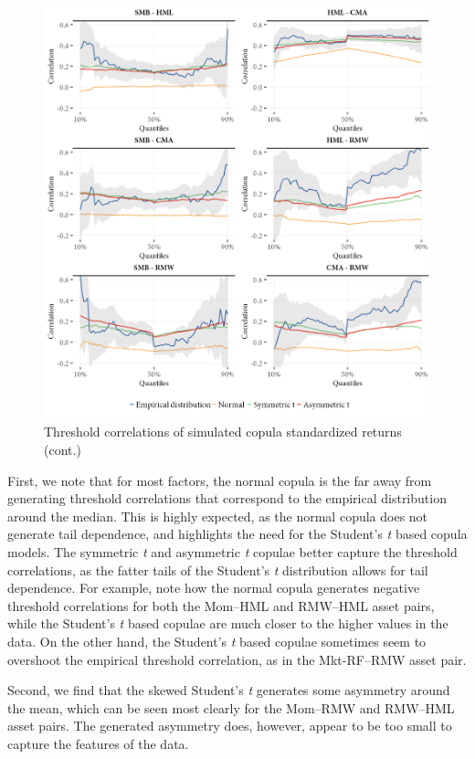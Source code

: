 \begin{figure}[!ht]
  \ContinuedFloat
  \centering
  \caption{Threshold correlations of simulated copula standardized returns (cont.)}
  \includegraphics[scale=1]{graphics/threshold_simulated_2.png}  
\end{figure}

First, we note that for most factors, the normal copula is the far away from generating threshold correlations that correspond to the empirical distribution around the median. This is highly expected, as the normal copula does not generate tail dependence, and highlights the need for the Student's \textit{t} based copula models. The symmetric \textit{t} and asymmetric \textit{t} copulae better capture the threshold correlations, as the fatter tails of the Student's \textit{t} distribution allows for tail dependence. For example, note how the normal copula generates negative threshold correlations for both the Mom--HML and RMW--HML asset pairs, while the Student's \textit{t} based copulae are much closer to the higher values in the data. On the other hand, the Student's \textit{t} based copulae sometimes seem to overshoot the empirical threshold correlation, as in the Mkt-RF--RMW asset pair.

Second, we find that the skewed Student's \textit{t} generates some asymmetry around the mean, which can be seen most clearly for the Mom--RMW and RMW--HML asset pairs. The generated asymmetry does, however, appear to be too small to capture the features of the data.

